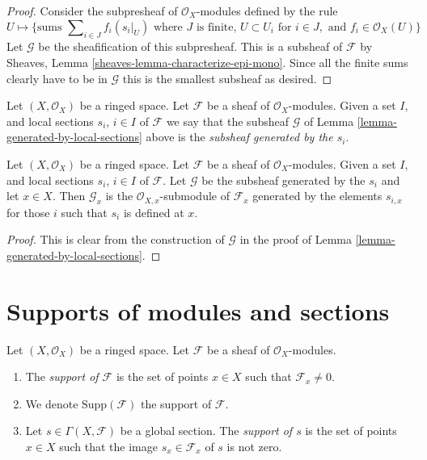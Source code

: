 \begin{proof}
Consider the subpresheaf of $\mathcal{O}_X$-modules
defined by the rule
$$
U
\longmapsto
\{
\text{sums } \sum\nolimits_{i \in J} f_i (s_i|_U)
\text{ where } J \text{ is finite, }
U \subset U_i \text{ for } i\in J, \text{ and }
f_i \in \mathcal{O}_X(U)
\}
$$
Let $\mathcal{G}$ be the sheafification of this subpresheaf.
This is a subsheaf of $\mathcal{F}$ by
Sheaves, Lemma \ref{sheaves-lemma-characterize-epi-mono}.
Since all the finite sums clearly have to be in $\mathcal{G}$
this is the smallest subsheaf as desired.
\end{proof}

\begin{definition}
\label{definition-generated-by-local-sections}
Let $(X, \mathcal{O}_X)$ be a ringed space.
Let $\mathcal{F}$ be a sheaf of $\mathcal{O}_X$-modules.
Given a set $I$, and
local sections $s_i$, $i \in I$ of $\mathcal{F}$
we say that the subsheaf $\mathcal{G}$ of
Lemma \ref{lemma-generated-by-local-sections}
above is the {\it subsheaf generated by the $s_i$}.
\end{definition}

\begin{lemma}
\label{lemma-generated-by-local-sections-stalk}
Let $(X, \mathcal{O}_X)$ be a ringed space.
Let $\mathcal{F}$ be a sheaf of $\mathcal{O}_X$-modules.
Given a set $I$, and
local sections $s_i$, $i \in I$ of $\mathcal{F}$.
Let $\mathcal{G}$ be the subsheaf generated by the
$s_i$ and let $x\in X$.
Then $\mathcal{G}_x$ is the $\mathcal{O}_{X, x}$-submodule of
$\mathcal{F}_x$ generated by the elements $s_{i, x}$
for those $i$ such that $s_i$ is defined at $x$.
\end{lemma}

\begin{proof}
This is clear from the construction of $\mathcal{G}$
in the proof of Lemma \ref{lemma-generated-by-local-sections}.
\end{proof}










\section{Supports of modules and sections}
\label{section-support}

\begin{definition}
\label{definition-support}
Let $(X, \mathcal{O}_X)$ be a ringed space.
Let $\mathcal{F}$ be a sheaf of $\mathcal{O}_X$-modules.
\begin{enumerate}
\item The {\it support of $\mathcal{F}$} is the set of
points $x \in X$ such that $\mathcal{F}_x \not = 0$.
\item We denote $\text{Supp}(\mathcal{F})$ the support of $\mathcal{F}$.
\item Let $s \in \Gamma(X, \mathcal{F})$ be a global section.
The {\it support of $s$} is the set of points $x \in X$
such that the image $s_x \in \mathcal{F}_x$ of $s$ is
not zero.
\end{enumerate}
\end{definition}

